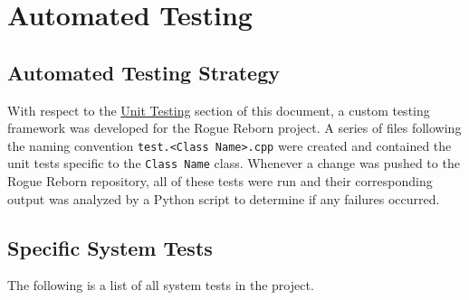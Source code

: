 \documentclass[12pt, titlepage]{article}
\newcommand{\newsection}[1]{\newpage\section{#1}}
\begin{document}
\newsection{Automated Testing} \label{Section_Automated}

	\subsection{Automated Testing Strategy}
	With respect to the \hyperref[Section_UT]{Unit Testing} section of this document, a custom testing framework was developed for the Rogue Reborn project.  A series of files following the naming convention \lstinline$test.<Class Name>.cpp$ were created and contained the unit tests specific to the \lstinline$Class Name$ class.  Whenever a change was pushed to the Rogue Reborn repository, all of these tests were run and their corresponding output was analyzed by a Python script to determine if any failures occurred.

	\subsection{Specific System Tests}
	The following is a list of all system tests in the project.
\end{document}
